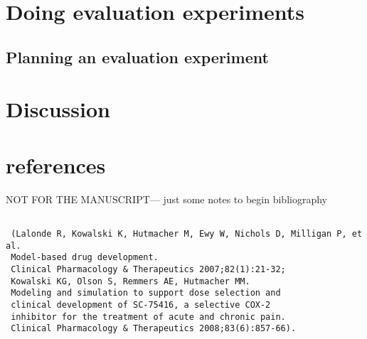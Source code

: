 \documentclass[12pt]{amsart}
\begin{document}
\section{Doing evaluation experiments}

\subsection{Planning an evaluation experiment}

\section{Discussion}


\section{references}
NOT FOR THE MANUSCRIPT--- just some notes to begin bibliography
\begin{verbatim}

 (Lalonde R, Kowalski K, Hutmacher M, Ewy W, Nichols D, Milligan P, et al. 
 Model-based drug development. 
 Clinical Pharmacology & Therapeutics 2007;82(1):21-32; 
 Kowalski KG, Olson S, Remmers AE, Hutmacher MM. 
 Modeling and simulation to support dose selection and 
 clinical development of SC-75416, a selective COX-2 
 inhibitor for the treatment of acute and chronic pain. 
 Clinical Pharmacology & Therapeutics 2008;83(6):857-66). 
\end{verbatim} 
\end{document}
